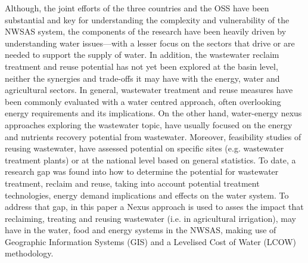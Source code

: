 Although, the joint efforts of the three countries and the OSS have been substantial and key for understanding the complexity and vulnerability of the NWSAS system, the components of the research have been heavily driven by understanding water issues---with a lesser focus on the sectors that drive or are needed to support the supply of water. In addition, the wastewater reclaim treatment and reuse potential has not yet been explored at the basin level, neither the synergies and trade-offs it may have with the energy, water and agricultural sectors. In general, wastewater treatment and reuse measures have been commonly evaluated with a water centred approach, often overlooking energy requirements and its implications. On the other hand, water-energy nexus approaches exploring the wastewater topic, have usually focused on the energy and nutrients recovery potential from wastewater. Moreover, feasibility studies of reusing wastewater, have assessed potential on specific sites (e.g. wastewater treatment plants) or at the national level based on general statistics. To date, a research gap was found into how to determine the potential for wastewater treatment, reclaim and reuse, taking into account potential treatment technologies, energy demand implications and effects on the water system. To address that gap, in this paper a Nexus approach is used to asses the impact that reclaiming, treating and reusing wastewater (i.e. in agricultural irrigation), may have in the water, food and energy systems in the NWSAS, making use of Geographic Information Systems (GIS) and a Levelised Cost of Water (LCOW) methodology.


